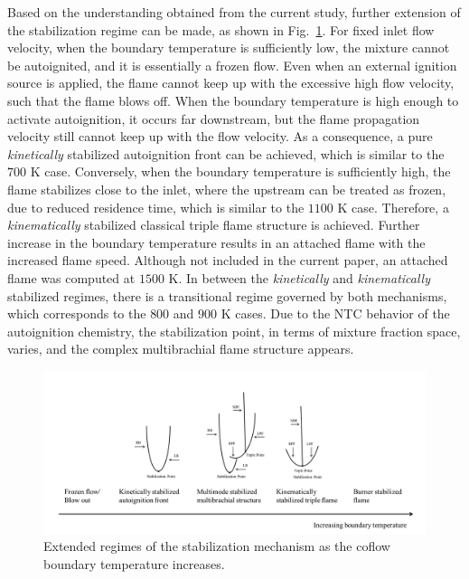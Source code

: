 \documentclass[review,3p,times]{elsarticle}
\begin{document}
Based on the understanding obtained from the current study, further extension of the stabilization regime can be made, as shown in Fig.~\ref{fig:regime}.  For fixed inlet flow velocity, when the boundary temperature is sufficiently low, the mixture cannot be autoignited, and it is essentially a frozen flow.  Even when an external ignition source is applied, the flame cannot keep up with the excessive high flow velocity, such that the flame blows off.  When the boundary temperature is high enough to activate autoignition, it occurs far downstream, but the flame propagation velocity still cannot keep up with the flow velocity.  As a consequence, a pure \emph {kinetically} stabilized autoignition front can be achieved, \textcolor{mycolor}{which is similar to the $700$ K case}.  Conversely, when the boundary temperature is sufficiently high, the flame stabilizes close to the inlet, where the upstream can be treated as frozen, due to reduced residence time, which is similar to the $1100$ K case.  Therefore, a \emph {kinematically} stabilized classical triple flame structure is achieved.  Further increase in the boundary temperature results in an attached flame with the increased flame speed.  Although not included in the current paper, an attached flame was computed at $1500$ K.  In between the \emph {kinetically} and \emph {kinematically} stabilized regimes, there is a transitional regime governed by both mechanisms, which corresponds to the $800$ and $900$ K cases.  Due to the NTC behavior of the autoignition chemistry, the stabilization point, in terms of mixture fraction space, varies, and the complex multibrachial flame structure appears.  

\begin{figure}[t]
  \centering
  \scriptsize
  \includegraphics[width=1.0\textwidth]{regime.png}
  \normalsize
  \caption{Extended regimes of the stabilization mechanism as the coflow boundary temperature increases.}
  \label{fig:regime}
\end{figure}
\end{document}
